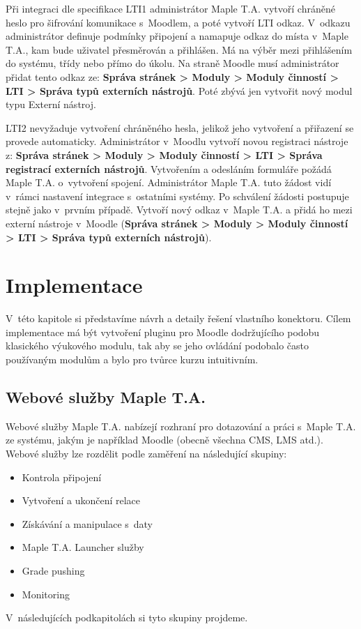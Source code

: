 \documentclass[
print,
  11pt,
  table,   
  nolof,    
  nolot,
  oneside,final
]{fithesis3}
\begin{document}
Při integraci dle specifikace LTI1 administrátor Maple T.A. vytvoří chráněné heslo pro šifrování komunikace s~Moodlem, a poté vytvoří LTI odkaz. V~odkazu administrátor definuje podmínky připojení a namapuje odkaz do místa v~Maple T.A., kam bude uživatel přesměrován a přihlášen. Má na výběr mezi přihlášením do systému, třídy nebo přímo do úkolu. Na straně Moodle musí administrátor přidat tento odkaz ze: \textbf{Správa stránek > Moduly > Moduly činností > LTI > Správa typů externích nástrojů}. Poté zbývá jen vytvořit nový modul typu Externí nástroj.


LTI2 nevyžaduje vytvoření chráněného hesla, jelikož jeho vytvoření a přiřazení se provede automaticky. Administrátor v~Moodlu vytvoří novou registraci nástroje z: \textbf{Správa stránek > Moduly > Moduly činností > LTI > Správa registrací externích nástrojů}. Vytvořením a odesláním formuláře požádá Maple T.A. o~vytvoření spojení. Administrátor Maple T.A. tuto žádost vidí v~rámci nastavení integrace s~ostatními systémy. Po schválení žádosti postupuje stejně jako v~prvním případě. Vytvoří nový odkaz v~Maple T.A. a přidá ho mezi externí nástroje v~Moodle (\textbf{Správa stránek > Moduly > Moduly činností > LTI > Správa typů externích nástrojů}).

\chapter{Implementace}
V~této kapitole si představíme návrh a detaily řešení vlastního konektoru. Cílem implementace má být vytvoření pluginu pro Moodle dodržujícího podobu klasického výukového modulu, tak aby se jeho ovládání podobalo často používaným modulům a bylo pro tvůrce kurzu intuitivním.
	\section{Webové služby Maple T.A.}
Webové služby Maple T.A. nabízejí rozhraní pro dotazování a práci s~Maple T.A. ze systému, jakým je například Moodle (obecně všechna CMS, LMS atd.). Webové služby lze rozdělit podle zaměření na následující skupiny:
\begin{itemize}
		\item Kontrola připojení
		\item Vytvoření a ukončení relace
		\item Získávání a manipulace s~daty
		\item Maple T.A. Launcher služby
		\item Grade pushing
		\item Monitoring

\end{itemize}
V~následujících podkapitolách si tyto skupiny projdeme.
\end{document}
